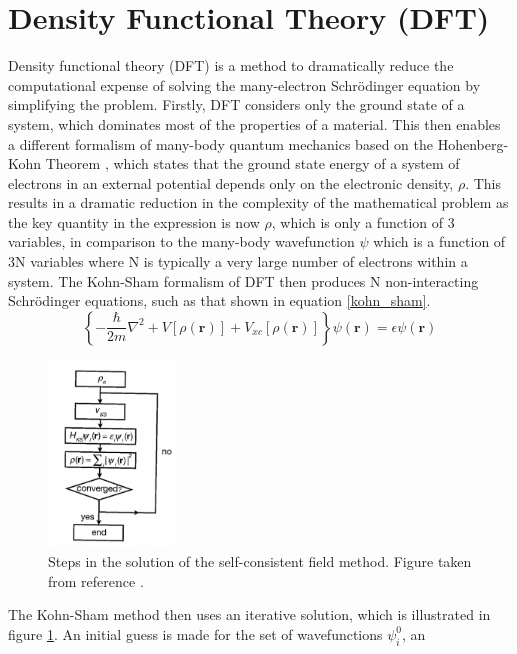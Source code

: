 \section*{Density Functional Theory (DFT)}\label{DFT_section}
Density functional theory (DFT) is a method to dramatically reduce the computational expense of solving the many-electron Schr{\"o}dinger equation by simplifying the problem. Firstly, DFT considers only the ground state of a system, which dominates most of the properties of a material. This then enables a different formalism of many-body quantum mechanics based on the Hohenberg-Kohn Theorem \cite{hohenberg_kohn}, which states that the ground state energy of a system of electrons in an external potential depends only on the electronic density, $\rho$. 
This results in a dramatic reduction in the complexity of the mathematical problem as the key quantity in the expression is now $\rho$, which is only a function of 3 variables, in comparison to the many-body wavefunction $\psi$ which is a function of 3N variables where N is typically a very large number of electrons within a system. The Kohn-Sham formalism of DFT then produces N non-interacting Schr{\"o}dinger equations, such as that shown in equation \ref{kohn_sham}. 
\begin{equation} \label{kohn_sham}
\left\{ - \frac{\hbar}{2m} \nabla^2 + V[\rho(\mathbf{r})] + V_{xc}[\rho(\mathbf{r})] \right\}\psi(\mathbf{r}) = \epsilon\psi(\mathbf{r})
\end{equation}
\begin{figure}[h!]
  \centering
    \includegraphics[width=0.3\textwidth]{figures/solving_SE.png}
    \caption{Steps in the solution of the self-consistent field method. Figure taken from reference .}
  \label{solving_SE}
\end{figure}
The Kohn-Sham method then uses an iterative solution, which is illustrated in figure 
\ref{solving_SE}. An initial guess is made for the set of wavefunctions $\psi_i^0$, an 
